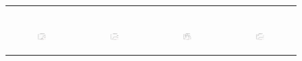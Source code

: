 \begin{figure}[ht]
\begin{tabular}{cccc}
\begin{subfigure}[b]{0.22\textwidth}
	  \end{subfigure} \\
	  \begin{subfigure}[b]{0.22\textwidth}
	  	\includegraphics[width=105pt]{images/diffFA_CF2G_bigsynthetic_maxgraphcut.pdf}
			\caption{}
			\label{appfig:diffFA_CF2G_bigsynthetic_maxgraphcut}
	  \end{subfigure} &
	  \begin{subfigure}[b]{0.22\textwidth}
	  	\includegraphics[width=105pt]{images/diffFA_CF2G_bigsynthetic_setcover.pdf}
			\caption{}
			\label{appfig:diffFA_CF2G_bigsynthetic_setcover}
	  \end{subfigure} &
	  \begin{subfigure}[b]{0.22\textwidth}
	  	\includegraphics[width=105pt]{images/diffFA_CF2G_zigzag_maxgraphcut.pdf}
			\caption{}
			\label{appfig:diffFA_CF2G_zigzag_maxgraphcut}
	  \end{subfigure} &
	  \begin{subfigure}[b]{0.22\textwidth}
	  	\includegraphics[width=105pt]{images/diffFA_CF2G_zigzag_setcover.pdf}
			\caption{}
			\label{appfig:diffFA_CF2G_zigzag_setcover}
	  \end{subfigure} \\

\end{tabular}
\end{figure}
